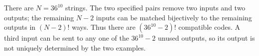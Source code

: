 There are $N=36^{10}$ strings. The two specified pairs remove two inputs and two outputs; the remaining $N-2$ inputs can be matched bijectively to the remaining outputs in $(N-2)!$ ways. Thus there are $\boxed{(36^{10}-2)!}$ compatible codes. A third input can be sent to any one of the $36^{10}-2$ unused outputs, so its output is not uniquely determined by the two examples.
